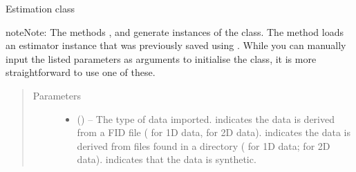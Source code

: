 \documentclass[letterpaper,10pt,english]{sphinxmanual}
\begin{document}
\begin{fulllineitems}
\label{\detokenize{references/core:nmrespy.core.Estimator}}
\sphinxAtStartPar
Estimation class

\begin{sphinxadmonition}{note}{Note:}
\sphinxAtStartPar
The methods {\hyperref[\detokenize{references/core:nmrespy.core.Estimator.new_bruker}]{}}, 
and  generate instances
of the class. The method {\hyperref[\detokenize{references/core:nmrespy.core.Estimator.from_pickle}]{}} loads an estimator
instance that was previously saved using {\hyperref[\detokenize{references/core:nmrespy.core.Estimator.to_pickle}]{}}.
While you can manually input the listed parameters
as arguments to initialise the class, it is more straightforward
to use one of these.
\end{sphinxadmonition}
\begin{quote}\begin{description}
\item[{Parameters}] \leavevmode\begin{itemize}
\item {} 
\sphinxAtStartPar
{} (\sphinxstyleliteralemphasis{\sphinxupquote{, }}\sphinxstyleliteralemphasis{\sphinxupquote{, }}) – The type of data imported.  indicates the data is
derived from a FID file ( for 1D data,  for 2D data).
 indicates the data is derived from files found
in a  directory ( for 1D data;  for 2D data).
 indicates that the data is synthetic.


\end{itemize}
\end{description}
\end{quote}
\end{fulllineitems}
\end{document}
